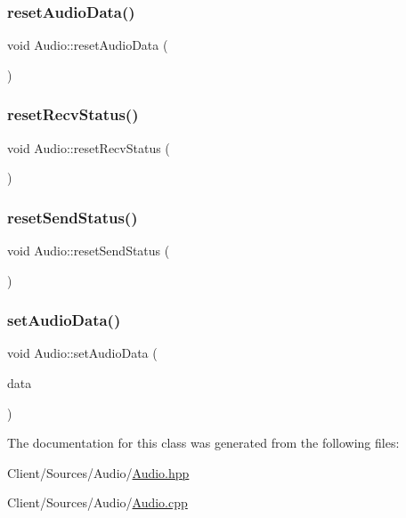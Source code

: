 \mbox{\label{classAudio_a604b771547540295ddf385556a652e38}} 
\subsubsection{\texorpdfstring{reset\+Audio\+Data()}{resetAudioData()}}
{\footnotesize\ttfamily void Audio\+::reset\+Audio\+Data (\begin{DoxyParamCaption}{ }\end{DoxyParamCaption})}

\mbox{\label{classAudio_af44fb4e83b466e7be6f9d5b137c35fbe}} 
\subsubsection{\texorpdfstring{reset\+Recv\+Status()}{resetRecvStatus()}}
{\footnotesize\ttfamily void Audio\+::reset\+Recv\+Status (\begin{DoxyParamCaption}{ }\end{DoxyParamCaption})}

\mbox{\label{classAudio_a73bbc82c0b6532c9d7ca41c755c3ceac}} 
\subsubsection{\texorpdfstring{reset\+Send\+Status()}{resetSendStatus()}}
{\footnotesize\ttfamily void Audio\+::reset\+Send\+Status (\begin{DoxyParamCaption}{ }\end{DoxyParamCaption})}

\mbox{\label{classAudio_af857b4249543a018a264f852610b0b17}} 
\subsubsection{\texorpdfstring{set\+Audio\+Data()}{setAudioData()}}
{\footnotesize\ttfamily void Audio\+::set\+Audio\+Data (\begin{DoxyParamCaption}\item[{\hyperlink{structaudioData}{audio\+Data} \&}]{data }\end{DoxyParamCaption})}



The documentation for this class was generated from the following files\+:\begin{DoxyCompactItemize}
\item 
Client/\+Sources/\+Audio/\hyperlink{Audio_8hpp}{Audio.\+hpp}\item 
Client/\+Sources/\+Audio/\hyperlink{Audio_8cpp}{Audio.\+cpp}\end{DoxyCompactItemize}
